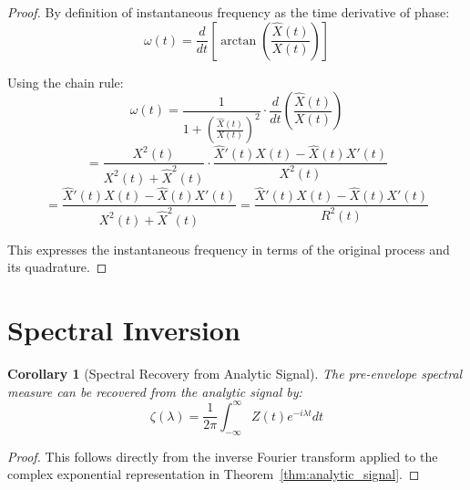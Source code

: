 \documentclass[11pt]{article}
\newtheorem{corollary}[theorem]{Corollary}
\begin{document}
\begin{proof}
By definition of instantaneous frequency as the time derivative of phase:
\begin{equation}
\label{eq:freq_derivative}
\omega(t) = \frac{d}{dt}\left[\arctan\left(\frac{\hat{X}(t)}{X(t)}\right)\right]
\end{equation}

Using the chain rule:
\begin{equation}
\label{eq:freq_chain_rule}
\omega(t) = \frac{1}{1 + \left(\frac{\hat{X}(t)}{X(t)}\right)^2} \cdot \frac{d}{dt}\left(\frac{\hat{X}(t)}{X(t)}\right)
\end{equation}
\begin{equation}
\label{eq:freq_quotient_rule}
= \frac{X^2(t)}{X^2(t) + \hat{X}^2(t)} \cdot \frac{\hat{X}'(t)X(t) - \hat{X}(t)X'(t)}{X^2(t)}
\end{equation}
\begin{equation}
\label{eq:freq_final}
= \frac{\hat{X}'(t)X(t) - \hat{X}(t)X'(t)}{X^2(t) + \hat{X}^2(t)} = \frac{\hat{X}'(t)X(t) - \hat{X}(t)X'(t)}{R^2(t)}
\end{equation}

This expresses the instantaneous frequency in terms of the original process and its quadrature.
\end{proof}

\section{Spectral Inversion}

\begin{corollary}[Spectral Recovery from Analytic Signal]
\label{cor:spectral_recovery_analytic}
The pre-envelope spectral measure can be recovered from the analytic signal by:
\begin{equation}
\label{eq:spectral_recovery_analytic}
\zeta(\lambda) = \frac{1}{2\pi} \int_{-\infty}^{\infty} Z(t) e^{-i\lambda t} dt
\end{equation}
\end{corollary}

\begin{proof}
This follows directly from the inverse Fourier transform applied to the complex exponential representation in Theorem~\ref{thm:analytic_signal}.
\end{proof}
\end{document}
